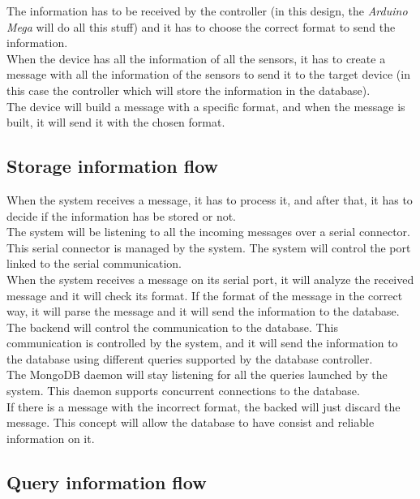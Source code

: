 The information has to be received by the controller (in this design, the \textit{Arduino Mega} will do all this stuff) and it has to choose the correct format to send the information.\\

When the device has all the information of all the sensors, it has to create a message with all the information of the sensors to send it to the target device (in this case the controller which will store the information in the database).\\

The device will build a message with a specific format, and when the message is built, it will send it with the chosen format.

\subsection{Storage information flow}

When the system receives a message, it has to process it, and after that, it has to decide if the information has be stored or not.\\

The system will be listening to all the incoming messages over a serial connector. This serial connector is managed by the system. The system will control the port linked to the serial communication.\\

When the system receives a message on its serial port, it will analyze the received message and it will check its format. If the format of the message in the correct way, it will parse the message and it will send the information to the database.\\

The backend will control the communication to the database. This communication is controlled by the system, and it will send the information to the database using different queries supported by the database controller.\\

The MongoDB daemon will stay listening for all the queries launched by the system. This daemon supports concurrent connections to the database.\\

If there is a message with the incorrect format, the backed will just discard the message. This concept will allow the database to have consist and reliable information on it.

\subsection{Query information flow}

